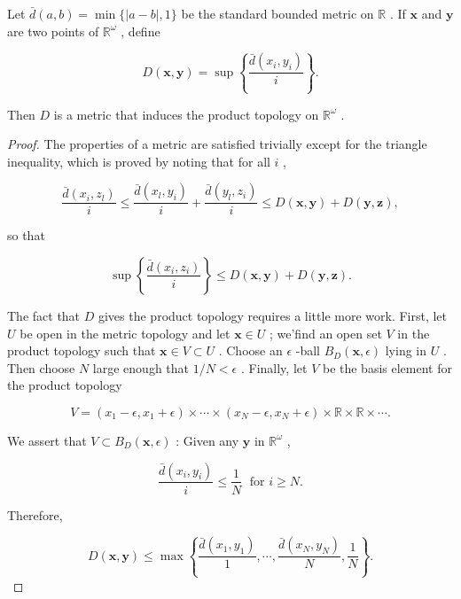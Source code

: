 \begin{theorem} Let \(\bar{d}\left( {a,b}\right)  = \min \{ \left| {a - b}\right| ,1\}\) be the standard bounded metric on \(\mathbb{R}\) . If \(\mathbf{x}\) and \(\mathbf{y}\) are two points of \({\mathbb{R}}^{\omega }\) , define

\[
D\left( {\mathbf{x},\mathbf{y}}\right)  = \sup \left\{  \frac{\bar{d}\left( {{x}_{i},{y}_{i}}\right) }{i}\right\}  .
\]

Then \(D\) is a metric that induces the product topology on \({\mathbb{R}}^{\omega }\) .

\end{theorem}
\begin{proof}
The properties of a metric are satisfied trivially except for the triangle inequality, which is proved by noting that for all \(i\) ,

\[
\frac{\bar{d}\left( {{x}_{i},{z}_{l}}\right) }{i} \leq  \frac{\bar{d}\left( {{x}_{l},{y}_{i}}\right) }{i} + \frac{\bar{d}\left( {{y}_{l},{z}_{i}}\right) }{i} \leq  D\left( {\mathbf{x},\mathbf{y}}\right)  + D\left( {\mathbf{y},\mathbf{z}}\right) ,
\]

so that

\[
\sup \left\{  \frac{\bar{d}\left( {{x}_{i},{z}_{i}}\right) }{i}\right\}   \leq  D\left( {\mathbf{x},\mathbf{y}}\right)  + D\left( {\mathbf{y},\mathbf{z}}\right) .
\]

The fact that \(D\) gives the product topology requires a little more work. First, let \(U\) be open in the metric topology and let \(\mathbf{x} \in  U\) ; we’find an open set \(V\) in the product topology such that \(\mathbf{x} \in  V \subset  U\) . Choose an \(\epsilon\) -ball \({B}_{D}\left( {\mathbf{x},\epsilon }\right)\) lying in \(U\) . Then choose \(N\) large enough that \(1/N < \epsilon\) . Finally, let \(V\) be the basis element for the product topology

\[
V = \left( {{x}_{1} - \epsilon ,{x}_{1} + \epsilon }\right)  \times  \cdots  \times  \left( {{x}_{N} - \epsilon ,{x}_{N} + \epsilon }\right)  \times  \mathbb{R} \times  \mathbb{R} \times  \cdots .
\]

We assert that \(V \subset  {B}_{D}\left( {\mathbf{x},\epsilon }\right)\) : Given any \(\mathbf{y}\) in \({\mathbb{R}}^{\omega }\) ,

\[
\frac{\bar{d}\left( {{x}_{i},{y}_{i}}\right) }{i} \leq  \frac{1}{N}\;\text{ for }i \geq  N.
\]

Therefore,

\[
D\left( {\mathbf{x},\mathbf{y}}\right)  \leq  \max \left\{  {\frac{\bar{d}\left( {{x}_{1},{y}_{1}}\right) }{1},\cdots ,\frac{\bar{d}\left( {{x}_{N},{y}_{N}}\right) }{N},\frac{1}{N}}\right\}  .
\]


\end{proof}
